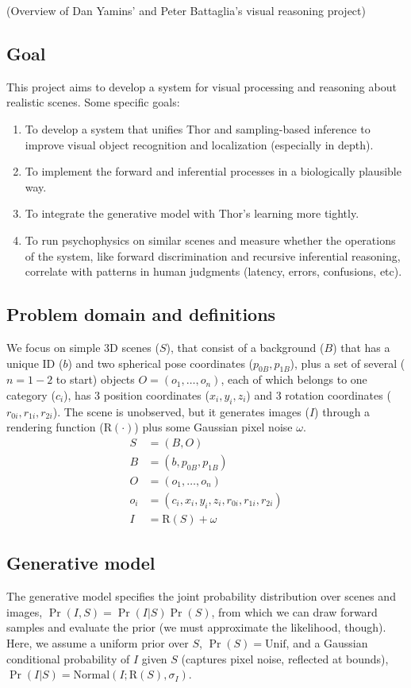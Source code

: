 \documentclass[]{report}
\begin{document}
\noindent
(Overview of Dan Yamins' and Peter Battaglia's visual reasoning project)

\subsection*{Goal}
This project aims to develop a system for visual processing and
reasoning about realistic scenes. Some specific goals:
\begin{enumerate}
\item To develop a system that unifies Thor and sampling-based
  inference to improve visual object recognition and localization
  (especially in depth).
\item To implement the forward and inferential processes in a
  biologically plausible way.
\item To integrate the generative model with Thor's learning more
  tightly.
\item To run psychophysics on similar scenes and measure whether the
  operations of the system, like forward discrimination and recursive
  inferential reasoning, correlate with patterns in human judgments
  (latency, errors, confusions, etc).
\end{enumerate}

\subsection*{Problem domain and definitions}
We focus on simple 3D scenes ($S$), that consist of a background ($B$)
that has a unique ID ($b$) and two spherical pose coordinates
($p_{0B}, p_{1B}$), plus a set of several ($n=1-2$ to start) objects
$O=(o_1,\dots,o_n)$, each of which belongs to one category ($c_i$),
has 3 position coordinates ($x_i,y_i,z_i$) and 3 rotation coordinates
($r_{0i},r_{1i},r_{2i}$). The scene is unobserved, but it generates
images ($I$) through a rendering function ($\mathrm{R}(\cdot)$) plus
some Gaussian pixel noise $\omega$.
\begin{align*}
  S &= (B, O)\\
  B &= (b, p_{0B}, p_{1B})\\
  O &= (o_1,\dots,o_n)\\
  o_i &= (c_i, x_i,y_i,z_i, r_{0i},r_{1i},r_{2i})\\
  I &= \mathrm{R}(S) + \omega
\end{align*}

\subsection*{Generative model}
The generative model specifies the joint probability distribution over
scenes and images, $\Pr(I,S) = \Pr(I | S)\Pr(S)$, from which we can
draw forward samples and evaluate the prior (we must approximate the
likelihood, though). Here, we assume a uniform prior over $S$, $\Pr(S)
= \mathrm{Unif}$, and a Gaussian conditional probability of $I$ given
$S$ (captures pixel noise, reflected at bounds), $\Pr(I | S) =
\mathrm{Normal}(I; \mathrm{R}(S), \sigma_I)$.
\end{document}
